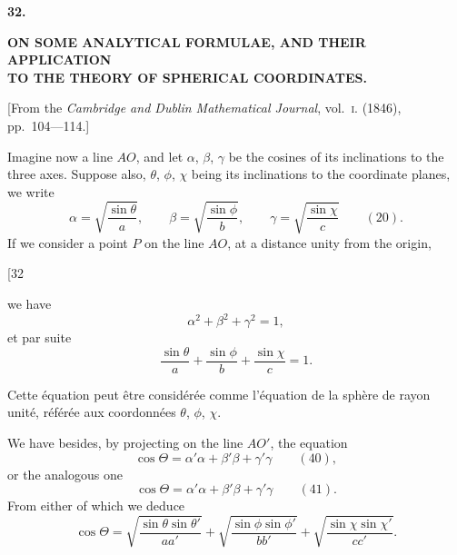 \documentclass[11pt,a4paper]{article}
\begin{document}

\newpage
{}
\setcounter{page}{217}

\begin{center}
{\large\bfseries 32.}
\end{center}
\vspace{0.5em}
\begin{center}
{\large\bfseries ON SOME ANALYTICAL FORMULAE, AND THEIR APPLICATION\\[0.3em]
TO THE THEORY OF SPHERICAL COORDINATES.}
\end{center}
\vspace{0.5em}
\begin{center}
{[From the \textit{Cambridge and Dublin Mathematical Journal}, vol.~\textsc{i}. (1846),\\
pp.~104---114.]}
\end{center}
\vspace{1em}

Imagine now a line $AO$, and let $\alpha$, $\beta$, $\gamma$ be the cosines of its inclinations to the
three axes. Suppose also, $\theta$, $\phi$, $\chi$ being its inclinations to the coordinate planes,
we write
\[
\alpha = \sqrt{\frac{\sin\theta}{a}}, \qquad \beta = \sqrt{\frac{\sin\phi}{b}}, \qquad \gamma = \sqrt{\frac{\sin\chi}{c}} \qquad (20).
\]
If we consider a point $P$ on the line $AO$, at a distance unity from the origin,

\newpage
\setcounter{page}{218}

\begin{center}
{\small [32}
\end{center}
\vspace{-1em}

we have
\[
\alpha^2 + \beta^2 + \gamma^2 = 1,
\]
et par suite
\[
\frac{\sin\theta}{a} + \frac{\sin\phi}{b} + \frac{\sin\chi}{c} = 1.
\]

Cette \'{e}quation peut \^{e}tre consid\'{e}r\'{e}e comme l'\'{e}quation de la sph\`{e}re de rayon unit\'{e},
r\'{e}f\'{e}r\'{e}e aux coordonn\'{e}es $\theta$, $\phi$, $\chi$.

\newpage
\setcounter{page}{219}

We have besides, by projecting on the line $AO'$, the equation
\[
\cos\Theta = \alpha'\alpha + \beta'\beta + \gamma'\gamma \qquad (40),
\]
or the analogous one
\[
\cos\Theta = \alpha'\alpha + \beta'\beta + \gamma'\gamma \qquad (41).
\]
From either of which we deduce
\[
\cos\Theta = \sqrt{\frac{\sin\theta \sin\theta'}{aa'}} + \sqrt{\frac{\sin\phi \sin\phi'}{bb'}} + \sqrt{\frac{\sin\chi \sin\chi'}{cc'}}.
\]
\end{document}
